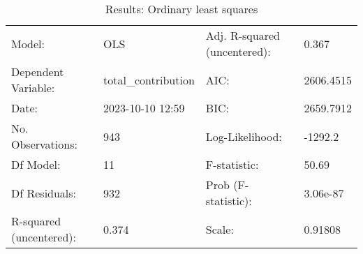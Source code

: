 \begin{table}
\caption{Results: Ordinary least squares}
\label{}
\begin{center}
\begin{tabular}{llll}
\hline
Model:                  & OLS                 & Adj. R-squared (uncentered): & 0.367      \\
Dependent Variable:     & total\_contribution & AIC:                         & 2606.4515  \\
Date:                   & 2023-10-10 12:59    & BIC:                         & 2659.7912  \\
No. Observations:       & 943                 & Log-Likelihood:              & -1292.2    \\
Df Model:               & 11                  & F-statistic:                 & 50.69      \\
Df Residuals:           & 932                 & Prob (F-statistic):          & 3.06e-87   \\
R-squared (uncentered): & 0.374               & Scale:                       & 0.91808    \\
\hline
\end{tabular}
\end{center}


\end{table}
